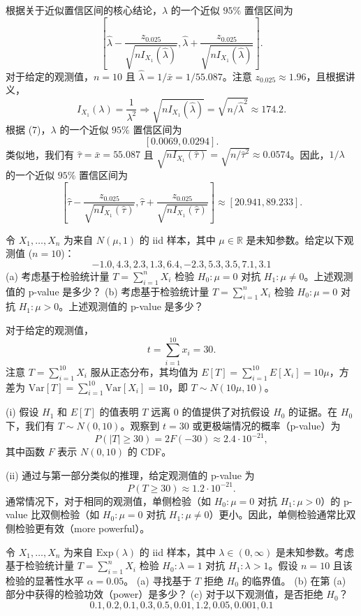 \begin{questions}
\begin{solution}
根据关于近似置信区间的核心结论，$\lambda$ 的一个近似 $95\%$ 置信区间为
\[
\left[ \hat{\lambda} - \frac{z_{0.025}}{\sqrt{n I_{X_1}(\hat{\lambda})}}, \hat{\lambda} + \frac{z_{0.025}}{\sqrt{n I_{X_1}(\hat{\lambda})}} \right]. \tag{7}
\]
对于给定的观测值，$n = 10$ 且 $\hat{\lambda} = 1/\bar{x} = 1/55.087$。注意 $z_{0.025} \approx 1.96$，且根据讲义，
\[
I_{X_1}(\lambda) = \frac{1}{\lambda^2} \Rightarrow \sqrt{n I_{X_1}(\hat{\lambda})} = \sqrt{n/\hat{\lambda}^2} \approx 174.2.
\]
根据 (7)，$\lambda$ 的一个近似 $95\%$ 置信区间为
\[
[0.0069, 0.0294].
\]
类似地，我们有 $\hat{\tau} = \bar{x} = 55.087$ 且 $\sqrt{n I_{X_1}(\hat{\tau})} = \sqrt{n/\hat{\tau}^2} \approx 0.0574$。因此，$1/\lambda$ 的一个近似 $95\%$ 置信区间为
\[
\left[ \hat{\tau} - \frac{z_{0.025}}{\sqrt{n I_{X_1}(\hat{\tau})}}, \hat{\tau} + \frac{z_{0.025}}{\sqrt{n I_{X_1}(\hat{\tau})}} \right] \approx [20.941, 89.233].
\]
\end{solution}

\question 令 $X_1, \dots, X_n$ 为来自 $N(\mu, 1)$ 的 iid 样本，其中 $\mu \in \mathbb{R}$ 是未知参数。给定以下观测值 ($n = 10$)：
\[
-1.0, 4.3, 2.3, 1.3, 6.4, -2.3, 5.3, 3.5, 7.1, 3.1
\]
(a) 考虑基于检验统计量 $T = \sum_{i=1}^n X_i$ 检验 $H_0 : \mu = 0$ 对抗 $H_1 : \mu \neq 0$。上述观测值的 p-value 是多少？
(b) 考虑基于检验统计量 $T = \sum_{i=1}^n X_i$ 检验 $H_0 : \mu = 0$ 对抗 $H_1 : \mu > 0$。上述观测值的 p-value 是多少？

\begin{solution}
对于给定的观测值，
\[
t = \sum_{i=1}^{10} x_i = 30.
\]
注意 $T = \sum_{i=1}^{10} X_i$ 服从正态分布，其均值为 $E[T] = \sum_{i=1}^{10} E[X_i] = 10\mu$，方差为 $\text{Var}[T] = \sum_{i=1}^{10} \text{Var}[X_i] = 10$，即 $T \sim N(10\mu, 10)$。

(i) 假设 $H_1$ 和 $E[T]$ 的值表明 $T$ 远离 $0$ 的值提供了对抗假设 $H_0$ 的证据。在 $H_0$ 下，我们有 $T \sim N(0, 10)$。观察到 $t = 30$ 或更极端情况的概率（p-value）为
\[
P(|T| \ge 30) = 2F(-30) \approx 2.4 \cdot 10^{-21},
\]
其中函数 $F$ 表示 $N(0, 10)$ 的 CDF。

(ii) 通过与第一部分类似的推理，给定观测值的 p-value 为
\[
P(T \ge 30) \approx 1.2 \cdot 10^{-21}.
\]
通常情况下，对于相同的观测值，单侧检验（如 $H_0 : \mu = 0$ 对抗 $H_1 : \mu > 0$）的 p-value 比双侧检验（如 $H_0 : \mu = 0$ 对抗 $H_1 : \mu \neq 0$）更小。因此，单侧检验通常比双侧检验更有效（more powerful）。
\end{solution}

\question 令 $X_1, \dots, X_n$ 为来自 $\text{Exp}(\lambda)$ 的 iid 样本，其中 $\lambda \in (0, \infty)$ 是未知参数。考虑基于检验统计量 $T = \sum_{i=1}^n X_i$ 检验 $H_0 : \lambda = 1$ 对抗 $H_1 : \lambda > 1$。假设 $n = 10$ 且该检验的显著性水平 $\alpha = 0.05$。
(a) 寻找基于 $T$ 拒绝 $H_0$ 的临界值。
(b) 在第 (a) 部分中获得的检验功效（power）是多少？
(c) 对于以下观测值，是否拒绝 $H_0$？
\[
0.1, 0.2, 0.1, 0.3, 0.5, 0.01, 1.2, 0.05, 0.001, 0.1
\]


\end{questions}

